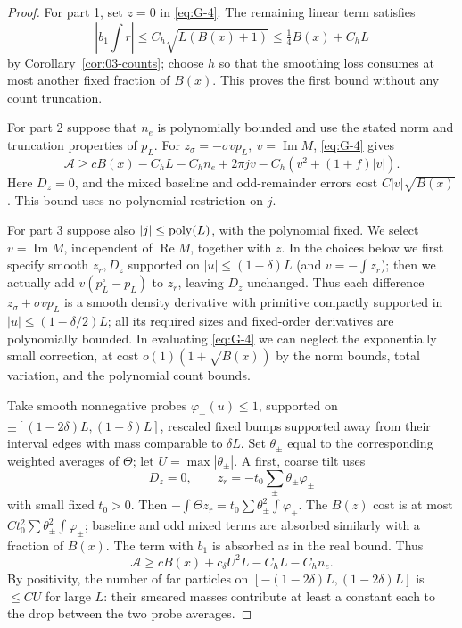 \begin{proof}
For part 1, set \(z=0\) in \eqref{eq:G-4}. The remaining
linear term satisfies
\[
 |b_1\textstyle\int r|\le C_h\sqrt{L(B(x)+1)}
                    \le \tfrac14B(x)+C_hL
\]
by Corollary~\ref{cor:03-counts}; choose \(h\) so that the smoothing
loss consumes at most another fixed fraction of \(B(x)\).
This proves the first bound without any count truncation.

For part 2 suppose that \(n_e\) is polynomially bounded and use the
stated norm and truncation properties of \(p_L\). For \(z_\sigma=-\sigma v p_L,\ v=\operatorname{Im}M\), \eqref{eq:G-4} gives
\begin{equation}
 \mathcal A\ge c B(x)-C_h L-C_h n_e+2\pi jv-C_h(v^2+(1+f)|v|).
 \label{eq:G-5}
\end{equation}
Here \(D_z=0\), and the mixed baseline and odd-remainder errors cost \(C|v|\sqrt{B(x)}\). This bound uses no polynomial restriction on \(j\).

For part 3 suppose also \(|j|\le{\rm poly}(L)\), with the polynomial fixed. We select \(v=\operatorname{Im}M\), independent of \(\operatorname{Re}M\), together with \(z\). In the choices below we first specify smooth \(z_r,D_z\) supported on \(|u|\le(1-\delta)L\) (and \(v=-\int z_r\)); then we actually add \(v(p_L^\circ-p_L)\) to \(z_r\), leaving \(D_z\) unchanged. Thus each difference \(z_\sigma+\sigma v p_L\) is a smooth density derivative with primitive compactly supported in \(|u|\le(1-\delta/2)L\); all its required sizes and fixed-order derivatives are polynomially bounded. In evaluating \eqref{eq:G-4} we can neglect the exponentially small correction, at cost \(o(1)(1+\sqrt{B(x)})\) by the norm bounds, total variation, and the polynomial count bounds.

Take smooth nonnegative probes \(\varphi_\pm(u)\le1\), supported on \(\pm[(1-2\delta)L,(1-\delta)L]\), rescaled fixed bumps supported away from their interval edges with mass comparable to \(\delta L\). Set \(\theta_\pm\) equal to the corresponding weighted averages of \(\Theta\); let \(U=\max|\theta_\pm|\). A first, coarse tilt uses
\[
 D_z=0,\qquad z_r=-t_0\sum_\pm\theta_\pm\varphi_\pm
\]
with small fixed \(t_0>0\). Then \(-\int\Theta z_r=t_0\sum\theta_\pm^2\int\varphi_\pm\). The \(B(z)\) cost is at most \(C t_0^2\sum\theta_\pm^2\int\varphi_\pm\); baseline and odd mixed terms are absorbed similarly with a fraction of \(B(x)\). The term with \(b_1\) is absorbed as in the real bound. Thus
\begin{equation}
 \mathcal A\ge cB(x)+c_\delta U^2 L-C_h L-C_h n_e .
 \label{eq:G-6}
\end{equation}
By positivity, the number of far particles on \([-(1-2\delta)L,(1-2\delta)L]\) is \(\le C U\) for large \(L\): their smeared masses contribute at least a constant each to the drop between the two probe averages.


\end{proof}
